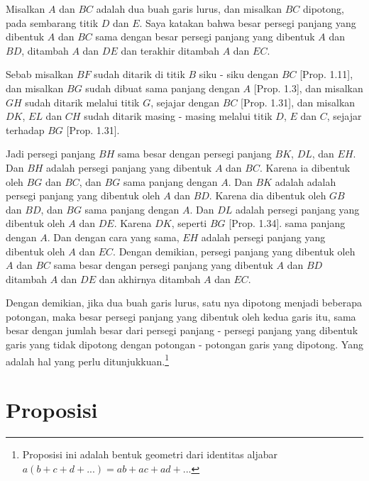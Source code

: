 \documentclass[a4paper]{book}
\begin{document}
Misalkan $A$ dan $BC$ adalah dua buah garis lurus, dan misalkan $BC$ dipotong,
pada sembarang titik $D$ dan $E$. Saya katakan bahwa besar persegi panjang yang 
dibentuk $A$ dan $BC$ sama dengan besar persegi panjang yang dibentuk $A$ 
dan $BD$, ditambah $A$ dan $DE$ dan terakhir ditambah $A$ dan $EC$.

Sebab misalkan $BF$ sudah ditarik di titik $B$ siku - siku dengan $BC$ 
[Prop. 1.11], dan misalkan $BG$ sudah dibuat sama panjang dengan $A$ 
[Prop. 1.3], dan misalkan $GH$ sudah ditarik melalui titik $G$, sejajar dengan
$BC$ [Prop. 1.31], dan misalkan $DK$, $EL$ dan $CH$ sudah ditarik masing 
- masing melalui titik $D$, $E$ dan $C$, sejajar terhadap $BG$ [Prop. 1.31].  

Jadi persegi panjang $BH$ sama besar dengan persegi panjang $BK$, $DL$, dan 
$EH$. Dan $BH$ adalah persegi panjang yang dibentuk $A$ dan $BC$. Karena ia
dibentuk oleh $BG$ dan $BC$, dan $BG$ sama panjang dengan $A$. Dan $BK$ adalah
adalah persegi panjang yang dibentuk oleh $A$ dan $BD$. Karena dia dibentuk oleh
$GB$ dan $BD$, dan $BG$ sama panjang dengan $A$. Dan $DL$ adalah persegi panjang 
yang dibentuk oleh $A$ dan $DE$. Karena $DK$, seperti $BG$ [Prop. 1.34]. sama 
panjang dengan $A$. Dan dengan cara yang sama,  $EH$ adalah persegi panjang
yang dibentuk oleh $A$ dan $EC$. Dengan demikian, persegi panjang yang
dibentuk oleh $A$ dan $BC$ sama besar dengan persegi panjang yang dibentuk
$A$ dan $BD$ ditambah $A$ dan $DE$ dan akhirnya ditambah $A$ dan $EC$. 

Dengan demikian, jika dua buah garis lurus, satu nya dipotong menjadi beberapa
potongan, maka besar persegi panjang yang dibentuk oleh kedua garis itu, sama
besar dengan jumlah besar dari persegi panjang - persegi panjang yang dibentuk 
garis yang tidak dipotong dengan potongan - potongan garis yang dipotong.
Yang adalah hal yang perlu ditunjukkuan.\footnote {Proposisi ini adalah
bentuk geometri dari identitas aljabar $a(b + c + d +...) = ab +ac + ad + ...$}

\section*{\centering Proposisi \thesection} 
\end{document}
